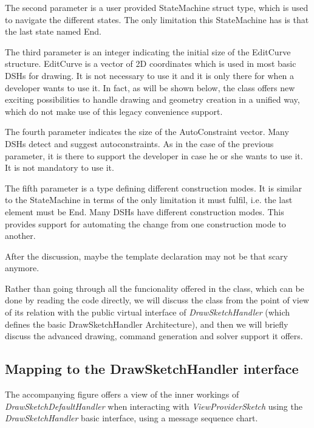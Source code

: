 \documentclass[12pt,twoside,a4paper]{book}
\newcommand{\DrawSketchHandler}{\emph{DrawSketchHandler}}
\newcommand{\ViewProviderSketch}{\emph{ViewProviderSketch}}
\newcommand{\DrawSketchDefaultHandler}{\emph{DrawSketchDefaultHandler}}
\begin{document}
    The second parameter is a user provided StateMachine struct type, which is used to navigate the different states. The only limitation this StateMachine has is that the last state named End.

    The third parameter is an integer indicating the initial size of the EditCurve structure. EditCurve is a vector of 2D coordinates which is used in most basic DSHs for drawing. It is not necessary to use it and it is only there for when a developer wants to use it. In fact, as will be shown below, the class offers new exciting possibilities to handle drawing and geometry creation in a unified way, which do not make use of this legacy convenience support.

    The fourth parameter indicates the size of the AutoConstraint vector. Many DSHs detect and suggest autoconstraints. As in the case of the previous parameter, it is there to support the developer in case he or she wants to use it. It is not mandatory to use it.

    The fifth parameter is a type defining different construction modes. It is similar to the StateMachine in terms of the only limitation it must fulfil, i.e. the last element must be End. Many DSHs have different construction modes. This provides support for automating the change from one construction mode to another.

    After the discussion, maybe the template declaration may not be that scary anymore.

    Rather than going through all the funcionality offered in the class, which can be done by reading the code directly, we will discuss the class from the point of view of its relation with the public virtual interface of \DrawSketchHandler{} (which defines the basic DrawSketchHandler Architecture), and then we will briefly discuss the advanced drawing, command generation and solver support it offers.

    \subsection{Mapping to the DrawSketchHandler interface}

    The accompanying figure offers a view of the inner workings of \DrawSketchDefaultHandler{} when interacting with \ViewProviderSketch{} using the \DrawSketchHandler{} basic interface, using a message sequence chart.
\end{document}
